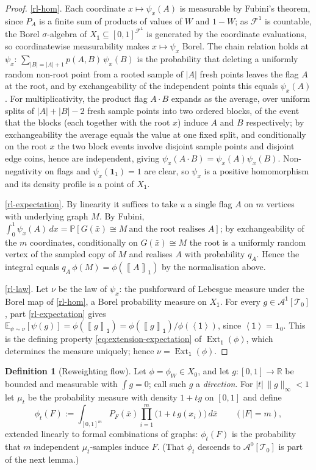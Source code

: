 \documentclass[11pt]{article}
\theoremstyle{definition}
\newtheorem{definition}[definition]{Definition}
\newcommand{\R}{\mathbb{R}}
\newcommand{\E}{\mathbb{E}}
\newcommand{\Prob}{\mathbb{P}}
\newcommand{\A}{\mathcal{A}}
\newcommand{\F}{\mathcal{F}}
\newcommand{\T}{\mathcal{T}}
\newcommand{\Ext}{\operatorname{Ext}}
\newcommand{\brak}[1]{\left\langle #1\right\rangle}
\newcommand{\avg}[2]{\left\llbracket #1 \right\rrbracket_{#2}}
\newcommand{\one}{\mathbf 1}
\newcommand{\vtype}{\mathsf{1}}
\begin{document}
\begin{proof}
\ref{rl-hom}.  Each coordinate $x\mapsto\psi_x(A)$ is measurable by Fubini's theorem,
since $P_A$ is a finite sum of products of values of $W$ and $1-W$; as
$\F^{\vtype}$ is countable, the Borel $\sigma$-algebra of
$X_\vtype\subseteq[0,1]^{\F^{\vtype}}$ is generated by the coordinate evaluations, so
coordinatewise measurability makes $x\mapsto\psi_x$ Borel.  The chain relation holds
at $\psi_x$: $\sum_{|B|=|A|+1}p(A,B)\,\psi_x(B)$ is the probability that deleting a
uniformly random non-root point from a rooted sample of $|A|$ fresh points leaves the
flag $A$ at the root, and by exchangeability of the independent points this equals
$\psi_x(A)$.  For multiplicativity, the product flag $A\cdot B$ expands as the
average, over uniform splits of $|A|+|B|-2$ fresh sample points into two ordered
blocks, of the event that the blocks (each together with the root $x$) induce $A$ and
$B$ respectively; by exchangeability the average equals the value at one fixed split,
and conditionally on the root $x$ the two block events involve disjoint sample points
and disjoint edge coins, hence are independent, giving
$\psi_x(A\cdot B)=\psi_x(A)\psi_x(B)$.  Non-negativity on flags and
$\psi_x(\one_\vtype)=1$ are clear, so $\psi_x$ is a positive homomorphism and its
density profile is a point of $X_\vtype$.

\ref{rl-expectation}.  By linearity it suffices to take $u$ a single flag $A$ on $m$
vertices with underlying graph $M$.  By Fubini,
$\int_0^1\psi_x(A)\,dx=\Prob[G(\bar x)\cong M\ \text{and the root realises }A]$; by
exchangeability of the $m$ coordinates, conditionally on $G(\bar x)\cong M$ the root
is a uniformly random vertex of the sampled copy of $M$ and realises $A$ with
probability $q_A$.  Hence the integral equals
$q_A\,\phi(M)=\phi(\avg{A}{\vtype})$ by the normalisation above.

\ref{rl-law}.  Let $\nu$ be the law of $\psi_x$: the pushforward of Lebesgue measure
under the Borel map of \ref{rl-hom}, a Borel probability measure on $X_\vtype$.  For
every $g\in\A^{\vtype}[\T_0]$, part \ref{rl-expectation} gives
$\E_{\psi\sim\nu}[\psi(g)]=\phi(\avg{g}{\vtype})=\phi(\avg{g}{\vtype})/\phi(\brak\vtype)$,
since $\brak\vtype=\one_0$.  This is the defining property
\eqref{eq:extension-expectation} of $\Ext_{\vtype}(\phi)$, which determines the measure
uniquely; hence $\nu=\Ext_{\vtype}(\phi)$.
\end{proof}

\begin{definition}[Reweighting flow]\label{def:reweighting}
Let $\phi=\phi_W\in X_0$, and let $g\colon[0,1]\to\R$ be bounded and measurable with
$\int g=0$; call such $g$ a \emph{direction}.  For $|t|\,\|g\|_\infty<1$ let $\mu_t$ be
the probability measure with density $1+tg$ on $[0,1]$ and define
\[
  \phi_t(F):=\int_{[0,1]^m}P_F(\bar x)\prod_{i=1}^m\bigl(1+t\,g(x_i)\bigr)\,d\bar x
  \qquad(|F|=m),
\]
extended linearly to formal combinations of graphs: $\phi_t(F)$ is the probability
that $m$ independent $\mu_t$-samples induce $F$.  (That $\phi_t$ descends to
$\A^0[\T_0]$ is part of the next lemma.)
\end{definition}
\end{document}
